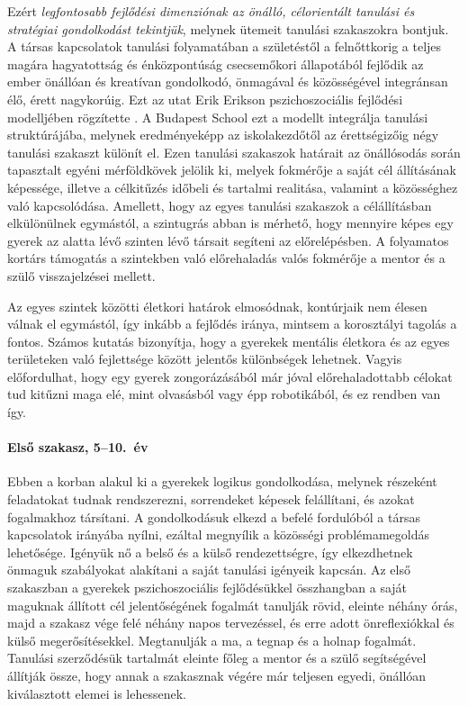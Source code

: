 Ezért \emph{legfontosabb fejlődési dimenziónak az önálló, célorientált
tanulási és stratégiai gondolkodást tekintjük}, melynek ütemeit tanulási
szakaszokra bontjuk. A társas kapcsolatok tanulási folyamatában a
születéstől a felnőttkorig a teljes magára hagyatottság és énközpontúság
csecsemőkori állapotából fejlődik az ember önállóan és kreatívan
gondolkodó, önmagával és közösségével integránsan élő, érett nagykorúig.
Ezt az utat Erik Erikson pszichoszociális fejlődési modelljében
rögzítette {\autocite{Erikson1991}}. A Budapest School ezt a modellt
integrálja tanulási struktúrájába, melynek eredményeképp az
iskolakezdőtől az érettségizőig négy tanulási szakaszt különít el. Ezen
tanulási szakaszok határait az önállósodás során tapasztalt egyéni
mérföldkövek jelölik ki, melyek fokmérője a saját cél állításának
képessége, illetve a célkitűzés időbeli és tartalmi realitása, valamint a
közösséghez való kapcsolódása. Amellett, hogy az egyes tanulási
szakaszok a célállításban elkülönülnek egymástól, a szintugrás abban is
mérhető, hogy mennyire képes egy gyerek az alatta lévő szinten lévő
társait segíteni az előrelépésben. A folyamatos kortárs támogatás a
szintekben való előrehaladás valós fokmérője a mentor és a szülő
visszajelzései mellett.

Az egyes szintek közötti életkori határok elmosódnak, kontúrjaik nem
élesen válnak el egymástól, így inkább a fejlődés iránya, mintsem a
korosztályi tagolás a fontos. Számos kutatás bizonyítja, hogy a gyerekek
mentális életkora és az egyes területeken való fejlettsége között
jelentős különbségek lehetnek. Vagyis előfordulhat, hogy egy gyerek
zongorázásából már jóval előrehaladottabb célokat tud kitűzni maga elé,
mint olvasásból vagy épp robotikából, és ez rendben van így.

\hypertarget{elso-szakasz-5-10-ev}{%
\paragraph{Első szakasz, 5--10.\ év}\label{elso-szakasz-5-10-ev}}

Ebben a korban alakul ki a gyerekek logikus gondolkodása, melynek
részeként feladatokat tudnak rendszerezni, sorrendeket képesek
felállítani, és azokat fogalmakhoz társítani. A gondolkodásuk elkezd a
befelé fordulóból a társas kapcsolatok irányába nyílni, ezáltal
megnyílik a közösségi problémamegoldás lehetősége. Igényük nő a belső és
a külső rendezettségre, így elkezdhetnek önmaguk szabályokat alakítani a
saját tanulási igényeik kapcsán. Az első szakaszban a gyerekek
pszichoszociális fejlődésükkel összhangban a saját maguknak állított cél
jelentőségének fogalmát tanulják rövid, eleinte néhány órás, majd a
szakasz vége felé néhány napos tervezéssel, és erre adott önreflexiókkal
és külső megerősítésekkel. Megtanulják a ma, a tegnap és a holnap
fogalmát. Tanulási szerződésük tartalmát eleinte főleg a mentor és a
szülő segítségével állítják össze, hogy annak a szakasznak végére már
teljesen egyedi, önállóan kiválasztott elemei is lehessenek.

